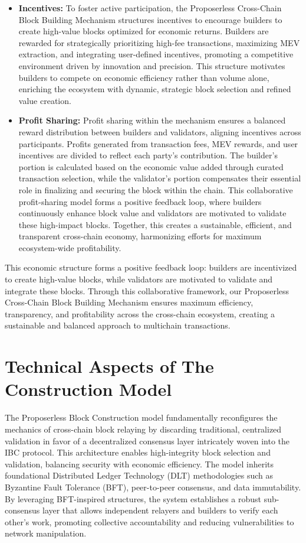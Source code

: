 \documentclass{article}
\begin{document}
\begin{itemize}
    \item \textbf{Incentives:} To foster active participation, the Proposerless Cross-Chain Block Building Mechanism structures incentives to encourage builders to create high-value blocks optimized for economic returns. Builders are rewarded for strategically prioritizing high-fee transactions, maximizing MEV extraction, and integrating user-defined incentives, promoting a competitive environment driven by innovation and precision. This structure motivates builders to compete on economic efficiency rather than volume alone, enriching the ecosystem with dynamic, strategic block selection and refined value creation.
    \item \textbf{Profit Sharing:} Profit sharing within the mechanism ensures a balanced reward distribution between builders and validators, aligning incentives across participants. Profits generated from transaction fees, MEV rewards, and user incentives are divided to reflect each party's contribution. The builder's portion is calculated based on the economic value added through curated transaction selection, while the validator's portion compensates their essential role in finalizing and securing the block within the chain. This collaborative profit-sharing model forms a positive feedback loop, where builders continuously enhance block value and validators are motivated to validate these high-impact blocks. Together, this creates a sustainable, efficient, and transparent cross-chain economy, harmonizing efforts for maximum ecosystem-wide profitability.
\end{itemize}

This economic structure forms a positive feedback loop: builders are incentivized to create high-value blocks, while validators are motivated to validate and integrate these blocks. Through this collaborative framework, our Proposerless Cross-Chain Block Building Mechanism ensures maximum efficiency, transparency, and profitability across the cross-chain ecosystem, creating a sustainable and balanced approach to multichain transactions.

\section{Technical Aspects of The Construction Model}

The Proposerless Block Construction model fundamentally reconfigures the mechanics of cross-chain block relaying by discarding traditional, centralized validation in favor of a decentralized consensus layer intricately woven into the IBC protocol. This architecture enables high-integrity block selection and validation, balancing security with economic efficiency. The model inherits foundational Distributed Ledger Technology (DLT) methodologies such as Byzantine Fault Tolerance (BFT), peer-to-peer consensus, and data immutability. By leveraging BFT-inspired structures, the system establishes a robust sub-consensus layer that allows independent relayers and builders to verify each other's work, promoting collective accountability and reducing vulnerabilities to network manipulation.
\end{document}
